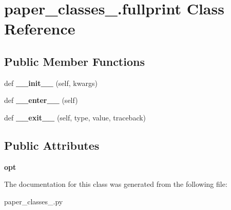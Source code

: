 \hypertarget{classpaper__classes__2_1_1fullprint}{}\section{paper\+\_\+classes\+\_.\+fullprint Class Reference}
\label{classpaper__classes__2_1_1fullprint}
\subsection*{Public Member Functions}
\begin{DoxyCompactItemize}
\item 
\mbox{\label{classpaper__classes__2_1_1fullprint_aa29fd28f7041d9d7db36b8592add54ca}} 
def {\bfseries \+\_\+\+\_\+init\+\_\+\+\_\+} (self, kwargs)
\item 
\mbox{\label{classpaper__classes__2_1_1fullprint_a9ac74b71f368eb045d724aeb8460d2a9}} 
def {\bfseries \+\_\+\+\_\+enter\+\_\+\+\_\+} (self)
\item 
\mbox{\label{classpaper__classes__2_1_1fullprint_ab04d4998645efe6a2223d1fba1b52b7c}} 
def {\bfseries \+\_\+\+\_\+exit\+\_\+\+\_\+} (self, type, value, traceback)
\end{DoxyCompactItemize}
\subsection*{Public Attributes}
\begin{DoxyCompactItemize}
\item 
\mbox{\label{classpaper__classes__2_1_1fullprint_a006512d37ac21893ba9a528e39f71428}} 
{\bfseries opt}
\end{DoxyCompactItemize}


The documentation for this class was generated from the following file\+:\begin{DoxyCompactItemize}
\item 
paper\+\_\+classes\+\_.\+py\end{DoxyCompactItemize}
